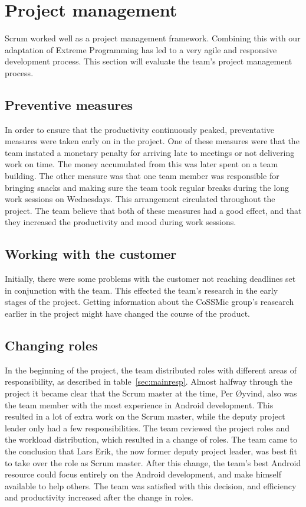 \section{Project management}
Scrum worked well as a project management framework. Combining this with our adaptation of Extreme Programming has led to a very agile and responsive development process. This section will evaluate the team's project management process.

\subsection{Preventive measures}
In order to ensure that the productivity continuously peaked, preventative measures were taken early on in the project. One of these measures were that the team instated a monetary penalty for arriving late to meetings or not delivering work on time. The money accumulated from this was later spent on a team building. The other measure was that one team member was responsible for bringing snacks and making sure the team took regular breaks during the long work sessions on Wednesdays. This arrangement circulated throughout the project. The team believe that both of these measures had a good effect, and that they increased the productivity and mood during work sessions.

\subsection{Working with the customer}
 Initially, there were some problems with the customer not reaching deadlines set in conjunction with the team. This effected the team's research in the early stages of the project. Getting information about the CoSSMic group's reasearch earlier in the project might have changed the course of the product. 

\subsection{Changing roles}
\label{sec:unbalancedWorkload}
In the beginning of the project, the team distributed roles with different areas of responsibility, as described in table~\ref{sec:mainresp}. Almost halfway through the project it became clear that the Scrum master at the time, Per Øyvind, also was the team member with the most experience in Android development. This resulted in a lot of extra work on the Scrum master, while the deputy project leader only had a few responsibilities. The team reviewed the project roles and the workload distribution, which resulted in a change of roles. The team came to the conclusion that Lars Erik, the now former deputy project leader, was best fit to take over the role as Scrum master. After this change, the team's best Android resource could focus entirely on the Android development, and make himself available to help others. The team was satisfied with this decision, and efficiency and productivity increased after the change in roles.

